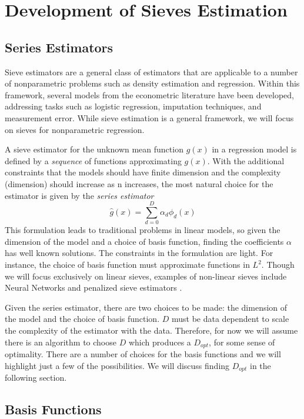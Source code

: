 \documentclass[12pt]{article}  %
\begin{document}
\section{Development of Sieves Estimation}

\subsection{Series Estimators}
Sieve estimators are a general class of estimators that are applicable to a number of nonparametric problems such as density estimation and regression. Within this framework, several models from the econometric literature have been developed, addressing tasks such as logistic regression, imputation techniques, and measurement error. While sieve estimation is a general framework, we will focus on sieves for nonparametric regression. 

A sieve estimator for the unknown mean function $g(x)$ in a regression model is defined by a \textit{sequence} of functions approximating $g(x)$. With the additional constraints that the models should have finite dimension and the complexity (dimension) should increase as n increases, the most natural choice for the estimator is given by the \textit{series estimator} 
$$ \hat{g}(x) = \sum_{d=0}^{D} \alpha_{d} \phi_{d}(x)$$ 
This formulation leads to traditional problems in linear models, so given the dimension of the model and a choice of basis function, finding the coefficients $\alpha$ has well known solutions. The constraints in the formulation are light. For instance, the choice of basis function must approximate functions in $L^2$. Though we will focus exclusively on linear sieves, examples of non-linear sieves include Neural Networks and penalized sieve estimators \cite{Chen}. 

Given the series estimator, there are two choices to be made: the dimension of the model and the choice of basis function.  $D$ must be data dependent to scale the complexity of the estimator with the data. Therefore, for now we will assume there is an algorithm to choose $D$ which produces a $D_{opt}$, for some sense of optimality. There are a number of choices for the basis functions and we will highlight just a few  of the possibilities. We will discuss finding $D_{opt}$ in the following section. 

\subsection{Basis Functions}
\end{document}
